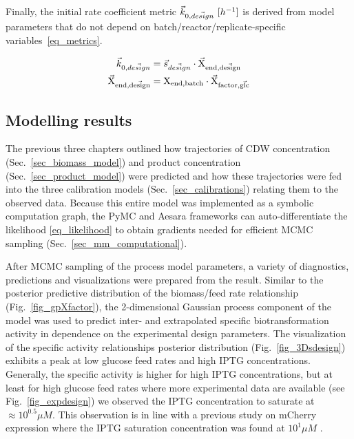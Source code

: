 \documentclass[sn-standardnature]{sn-jnl}%
\def\vec{\mathaccent "017E\relax }
\theoremstyle{thmstyleone}%
\theoremstyle{thmstyletwo}%
\theoremstyle{thmstylethree}%
\begin{document}
Finally, the initial rate coefficient metric $\vec{k}_{0,\vec{design}}\ [h^{-1}]$ is derived from model parameters that do not depend on batch/reactor/replicate-specific variables~\eqref{eq_metrics}.

\begin{equation}
\begin{aligned}
    \vec{k}_{0,\vec{design}} &= \vec{s}_{\vec{design}} \cdot \mathrm{\vec{X}_{end,\vec{design}}} \\
    \mathrm{\vec{X}_{end,\vec{design}}} &= \mathrm{X_{end,batch}} \cdot \mathrm{\vec{X}_{factor,\vec{glc}}}
\end{aligned}
\label{eq_metrics}
\end{equation}


\subsection{Modelling results}
The previous three chapters outlined how trajectories of CDW concentration (Sec.~\ref{sec_biomass_model}) and product concentration (Sec.~\ref{sec_product_model}) were predicted and how these trajectories were fed into the three calibration models (Sec.~\ref{sec_calibrations}) relating them to the observed data.
Because this entire model was implemented as a symbolic computation graph, the PyMC and Aesara frameworks can auto-differentiate the likelihood \eqref{eq_likelihood} to obtain gradients needed for efficient MCMC sampling (Sec.~\ref{sec_mm_computational}).

After MCMC sampling of the process model parameters, a variety of diagnostics, predictions and visualizations were prepared from the result.
Similar to the posterior predictive distribution of the biomass/feed rate relationship (Fig.~\ref{fig_gpXfactor}), the 2-dimensional Gaussian process component of the model was used to predict inter- and extrapolated specific biotransformation activity in dependence on the experimental design parameters.
The visualization of the specific activity relationships posterior distribution (Fig.~\ref{fig_3Dsdesign}) exhibits a peak at low glucose feed rates and high IPTG concentrations.
Generally, the specific activity is higher for high IPTG concentrations, but at least for high glucose feed rates where more experimental data are available (see Fig.~\ref{fig_expdesign}) we observed the IPTG concentration to saturate at $\approx 10^{0.5} \mu M$.
This observation is in line with a previous study on mCherry expression where the IPTG saturation concentration was found at $10^1 \mu M$ \cite{von2021automated}.
\end{document}
